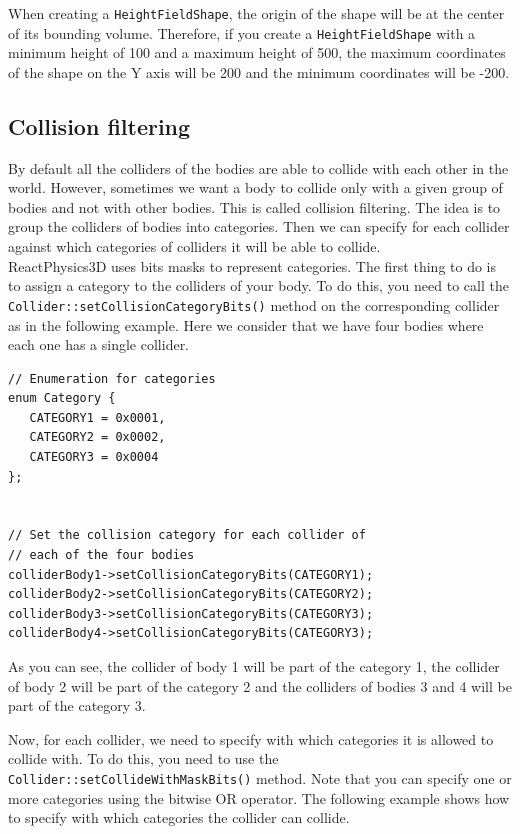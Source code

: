 \documentclass[a4paper,12pt]{article}
\begin{document}
  When creating a \texttt{HeightFieldShape}, the origin of the shape will be at the center of its bounding volume.
  Therefore, if you create a \texttt{HeightFieldShape} with a minimum height of 100 and a maximum height of 500, the
  maximum coordinates of the shape on the Y axis will be 200 and the minimum coordinates will be -200.

    \subsection{Collision filtering}
    \label{sec:collisionfiltering}

    By default all the colliders of the bodies are able to collide with each other in the world. However, sometimes we want a body to collide only
    with a given group of bodies and not with other bodies. This is called collision filtering. The idea is to group the colliders of bodies into
    categories. Then we can specify for each collider against which categories of colliders it will be able to collide. \\

    ReactPhysics3D uses bits masks to represent categories. The first thing to do is to assign a category to the colliders of your body. To do
    this, you need to call the \texttt{Collider::setCollisionCategoryBits()} method on the corresponding collider as in the following example. Here
    we consider that we have four bodies where each one has a single collider. \\

    \begin{lstlisting}
// Enumeration for categories
enum Category {
   CATEGORY1 = 0x0001,
   CATEGORY2 = 0x0002,
   CATEGORY3 = 0x0004
};


// Set the collision category for each collider of
// each of the four bodies
colliderBody1->setCollisionCategoryBits(CATEGORY1);
colliderBody2->setCollisionCategoryBits(CATEGORY2);
colliderBody3->setCollisionCategoryBits(CATEGORY3);
colliderBody4->setCollisionCategoryBits(CATEGORY3);
  \end{lstlisting}

    \vspace{0.6cm}

    As you can see, the collider of body 1 will be part of the category 1, the collider of body 2 will be part of the category 2 and the colliders of
    bodies 3 and 4 will be part of the category 3. \\

    \begin{sloppypar}
    Now, for each collider, we need to specify with which categories it is allowed to collide with. To do this, you need to use the 
    \texttt{Collider::setCollideWithMaskBits()} method. Note that you can specify one or more categories using the bitwise OR operator. The
    following example shows how to specify with which categories the collider can collide. \\
    \end{sloppypar}
\end{document}
